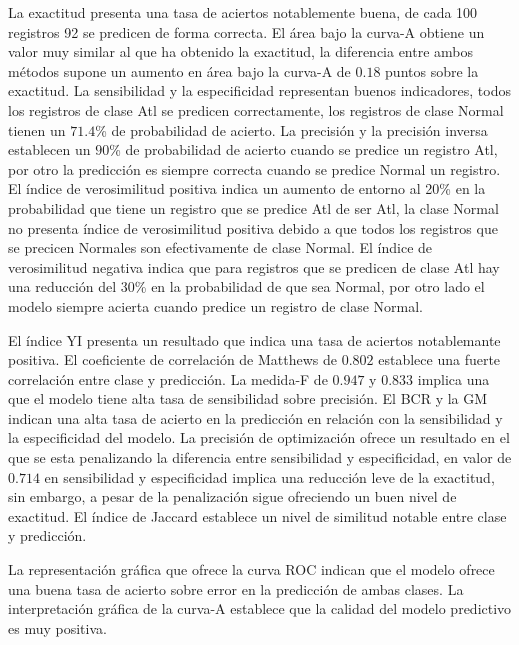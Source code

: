 La exactitud presenta una tasa de aciertos notablemente buena, de cada 100 registros 92 se predicen de forma correcta. El área bajo la curva-A obtiene un valor muy similar al que ha obtenido la exactitud, la diferencia entre ambos métodos supone un aumento en área bajo la curva-A de $0.18$ puntos sobre la exactitud. La sensibilidad y la especificidad representan buenos indicadores, todos los registros de clase Atl se predicen correctamente, los registros de clase Normal tienen un $71.4$\% de probabilidad de acierto. La precisión y la precisión inversa establecen un $90$\% de probabilidad de acierto cuando se predice un registro Atl, por otro la predicción es siempre correcta cuando se predice Normal un registro. El índice de verosimilitud positiva indica un aumento de entorno al 20\% en la probabilidad que tiene un registro que se predice Atl de ser Atl, la clase Normal no presenta índice de verosimilitud positiva debido a que todos los registros que se precicen Normales son efectivamente de clase Normal. El índice de verosimilitud negativa indica que para registros que se predicen de clase Atl hay una reducción del 30\% en la probabilidad de que sea Normal, por otro lado el modelo siempre acierta cuando predice un registro de clase Normal.

\bigbreak

El índice YI presenta un resultado que indica una tasa de aciertos notablemante positiva. El coeficiente de correlación de Matthews de $0.802$ establece una fuerte correlación entre clase y predicción. La medida-F de $0.947$ y $0.833$ implica una que el modelo tiene alta tasa de sensibilidad sobre precisión. El BCR y la GM indican una alta tasa de acierto en la predicción en relación con la sensibilidad y la especificidad del modelo. La precisión de optimización ofrece un resultado en el que se esta penalizando la diferencia entre sensibilidad y especificidad, en valor de $0.714$ en sensibilidad y especificidad implica una reducción leve de la exactitud, sin embargo, a pesar de la penalización sigue ofreciendo un buen nivel de exactitud. El índice de Jaccard establece un nivel de similitud notable entre clase y predicción.

\bigbreak

La representación gráfica que ofrece la curva ROC indican que el modelo ofrece una buena tasa de acierto sobre error en la predicción de ambas clases. La interpretación gráfica de la curva-A establece que la calidad del modelo predictivo es muy positiva.


\clearpage

